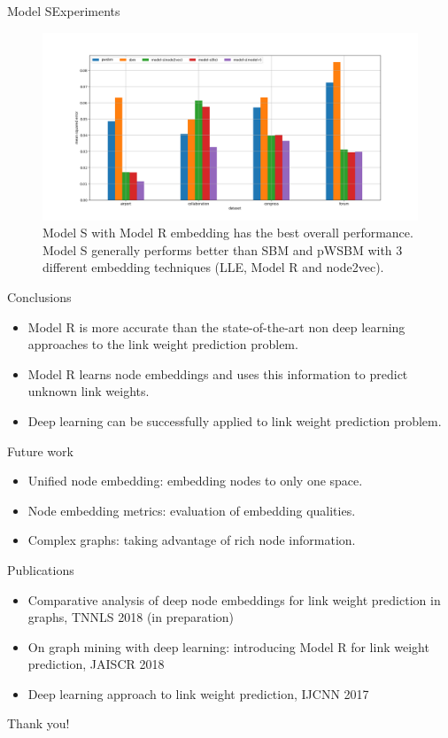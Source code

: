 \documentclass{beamer}
\begin{document}
\begin{frame}{Model S}{Experiments}
	\begin{figure}[ht] \centering
		\includegraphics[width=1\linewidth]{weight-errors}
		\caption{
			Model S with Model R embedding has the best overall performance. Model S generally performs better than SBM and pWSBM with 3 different embedding techniques (LLE, Model R and node2vec).
		}
		\label{fig:weight-errors}
	\end{figure}
\end{frame}

\begin{frame}{Conclusions}
	\begin{itemize}
		\item Model R is more accurate than the state-of-the-art non deep learning approaches to the link weight prediction problem.
		\item Model R learns node embeddings and uses this information to predict unknown link weights.
		\item Deep learning can be successfully applied to link weight prediction problem.
	\end{itemize}
\end{frame}

\begin{frame}{Future work}
	\begin{itemize}
		\item Unified node embedding: embedding nodes to only one space.
		\item Node embedding metrics: evaluation of embedding qualities.
		\item Complex graphs: taking advantage of rich node information.
	\end{itemize}
\end{frame}

\begin{frame}{Publications}
	\begin{itemize}
		\item Comparative analysis of deep node embeddings for link weight prediction in graphs, TNNLS 2018 (in preparation)
		\item On graph mining with deep learning: introducing Model R for link weight prediction, JAISCR 2018
		\item Deep learning approach to link weight prediction, IJCNN 2017
	\end{itemize}
\end{frame}

\begin{frame}
	\begin{center}
		\Huge Thank you!
	\end{center}
\end{frame}
\end{document}

